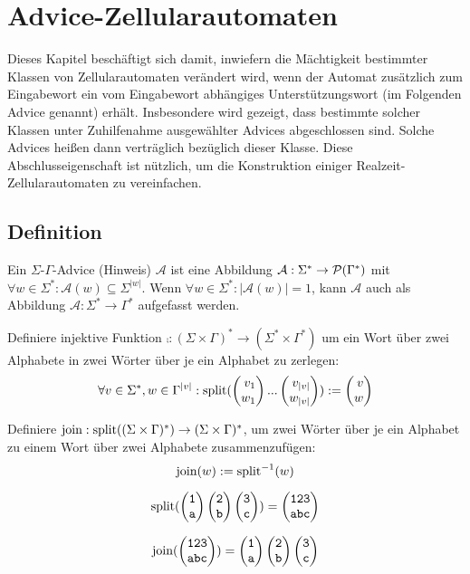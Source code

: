 \chapter{Advice-Zellularautomaten}
\label{chap:AdvAuto}

Dieses Kapitel beschäftigt sich damit, inwiefern die Mächtigkeit bestimmter Klassen von Zellularautomaten verändert wird,
wenn der Automat zusätzlich zum Eingabewort ein vom Eingabewort abhängiges Unterstützungswort (im Folgenden Advice genannt) erhält.
Insbesondere wird gezeigt, dass bestimmte solcher Klassen unter Zuhilfenahme ausgewählter Advices abgeschlossen sind.
Solche Advices heißen dann verträglich bezüglich dieser Klasse.
Diese Abschlusseigenschaft ist nützlich, um die Konstruktion einiger Realzeit-Zellularautomaten zu vereinfachen.

\section{Definition}

\begin{definition}
    Ein $\Sigma$-$\Gamma$-Advice (Hinweis) $\mathcal{A}$ ist eine Abbildung
        $\mathcal{A}: \Sigma^* \to \mathcal{P}(\Gamma^*)$ mit $\forall w \in \Sigma^*: \mathcal{A}(w) \subseteq \Sigma^{|w|}$.
    Wenn $\forall w \in \Sigma^*: |\mathcal{A}(w)| = 1$, kann $\mathcal{A}$ auch
    als Abbildung $\mathcal{A} : \Sigma^* \to \Gamma^*$ aufgefasst werden.
\end{definition}

\begin{definition}
    Definiere injektive Funktion $\comp: (\Sigma \times \Gamma)^* \to (\Sigma^* \times \Gamma^*)$
    um ein Wort über zwei Alphabete in zwei Wörter über je ein Alphabet zu zerlegen:
    \[
        \forall v \in \Sigma^*, w \in \Gamma^{|v|}: \comp(\Spvek{v_1; w_1}...\Spvek{v_{|v|}; w_{|v|}}) := \Spvek{v; w}
    \]
    
    Definiere $\textrm{join}: \textrm{split}((\Sigma \times \Gamma)^*) \to (\Sigma \times \Gamma)^*$,
    um zwei Wörter über je ein Alphabet zu einem Wort über zwei Alphabete zusammenzufügen:
    \[
        \textrm{join}(w) := \textrm{split}^{-1}(w)
    \]
    
\end{definition}

\begin{exmp}
    \[
        \comp(\Spvek{\chr{1}; \chr{a}}\Spvek{\chr{2}; \chr{b}}\Spvek{\chr{3}; \chr{c}}) = \Spvek{\chr{123}; \chr{abc}}
    \]
    
    \[
        \comb(\Spvek{\chr{123}; \chr{abc}}) = \Spvek{\chr{1}; \chr{a}}\Spvek{\chr{2}; \chr{b}}\Spvek{\chr{3}; \chr{c}}
    \]        
\end{exmp}


